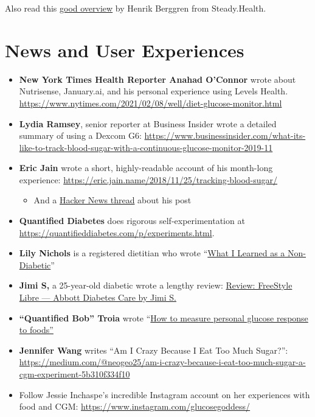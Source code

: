 \documentclass[
]{book}
\providecommand{\tightlist}{%
  \setlength{\itemsep}{0pt}\setlength{\parskip}{0pt}}
\begin{document}
Also read this \href{https://medium.com/steady-health/the-ultimate-guide-to-continuous-glucose-monitors-cgm-611eecc70c9a}{good overview} by Henrik Berggren from Steady.Health.

\hypertarget{news-and-user-experiences}{%
\chapter{News and User Experiences}\label{news-and-user-experiences}}

\begin{itemize}
\tightlist
\item
  \textbf{New York Times Health Reporter Anahad O'Connor} wrote about Nutrisense, January.ai, and his personal experience using Levels Health. \url{https://www.nytimes.com/2021/02/08/well/diet-glucose-monitor.html}
\item
  \textbf{Lydia Ramsey}, senior reporter at Business Insider wrote a detailed summary of using a Dexcom G6: \url{https://www.businessinsider.com/what-its-like-to-track-blood-sugar-with-a-continuous-glucose-monitor-2019-11}
\item
  \textbf{Eric Jain }wrote a short, highly-readable account of his month-long experience: \url{https://eric.jain.name/2018/11/25/tracking-blood-sugar/}

  \begin{itemize}
  \tightlist
  \item
    And a \href{https://news.ycombinator.com/item?id=18891772}{Hacker News thread} about his post
  \end{itemize}
\item
  \textbf{Quantified Diabetes }does rigorous self-experimentation at \url{https://quantifieddiabetes.com/p/experiments.html}.\\
\item
  \textbf{Lily Nichols} is a registered dietitian who wrote ``\href{https://lilynicholsrdn.com/cgm-experiment-non-diabetic-continuous-glucose-monitor/}{What I Learned as a Non-Diabetic}''
\item
  \textbf{Jimi S,} a 25-year-old diabetic wrote a lengthy review: \href{https://medium.com/@JimiS/product-review-freestyle-libre-abbott-diabetes-care-561ee446eaa}{Review: FreeStyle Libre --- Abbott Diabetes Care \textbar{} by Jimi S.}
\item
  \textbf{``Quantified Bob'' Troia} wrote ``\href{https://www.quantifiedbob.com/measuring-glycemic-glucose-response-foods/}{How to measure personal glucose response to foods''}
\item
  \textbf{Jennifer Wang} writes ``Am I Crazy Because I Eat Too Much Sugar?'': \url{https://medium.com/@neogeo25/am-i-crazy-because-i-eat-too-much-sugar-a-cgm-experiment-5b310f334f10}
\item
  Follow Jessie Inchaspe's incredible Instagram account on her experiences with food and CGM: \url{https://www.instagram.com/glucosegoddess/}
\end{itemize}
\end{document}
